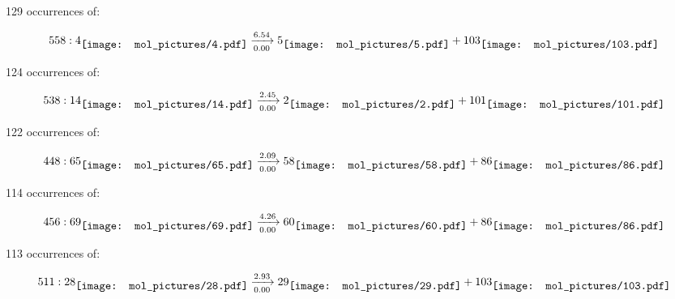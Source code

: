 \documentclass{article}
\begin{document}
\vspace{1cm}


129 occurrences of:

$$
558:  
4
\raisebox{-.5\height}{\texttt{[image: mol\_pictures/4.pdf]}}
\xrightarrow[0.00]{6.54}
5
\raisebox{-.5\height}{\texttt{[image: mol\_pictures/5.pdf]}}
+
103
\raisebox{-.5\height}{\texttt{[image: mol\_pictures/103.pdf]}}
$$



\vspace{1cm}


124 occurrences of:

$$
538:  
14
\raisebox{-.5\height}{\texttt{[image: mol\_pictures/14.pdf]}}
\xrightarrow[0.00]{2.45}
2
\raisebox{-.5\height}{\texttt{[image: mol\_pictures/2.pdf]}}
+
101
\raisebox{-.5\height}{\texttt{[image: mol\_pictures/101.pdf]}}
$$



\vspace{1cm}


122 occurrences of:

$$
448:  
65
\raisebox{-.5\height}{\texttt{[image: mol\_pictures/65.pdf]}}
\xrightarrow[0.00]{2.09}
58
\raisebox{-.5\height}{\texttt{[image: mol\_pictures/58.pdf]}}
+
86
\raisebox{-.5\height}{\texttt{[image: mol\_pictures/86.pdf]}}
$$



\vspace{1cm}


114 occurrences of:

$$
456:  
69
\raisebox{-.5\height}{\texttt{[image: mol\_pictures/69.pdf]}}
\xrightarrow[0.00]{4.26}
60
\raisebox{-.5\height}{\texttt{[image: mol\_pictures/60.pdf]}}
+
86
\raisebox{-.5\height}{\texttt{[image: mol\_pictures/86.pdf]}}
$$



\vspace{1cm}


113 occurrences of:

$$
511:  
28
\raisebox{-.5\height}{\texttt{[image: mol\_pictures/28.pdf]}}
\xrightarrow[0.00]{2.93}
29
\raisebox{-.5\height}{\texttt{[image: mol\_pictures/29.pdf]}}
+
103
\raisebox{-.5\height}{\texttt{[image: mol\_pictures/103.pdf]}}
$$



\vspace{1cm}
\end{document}
